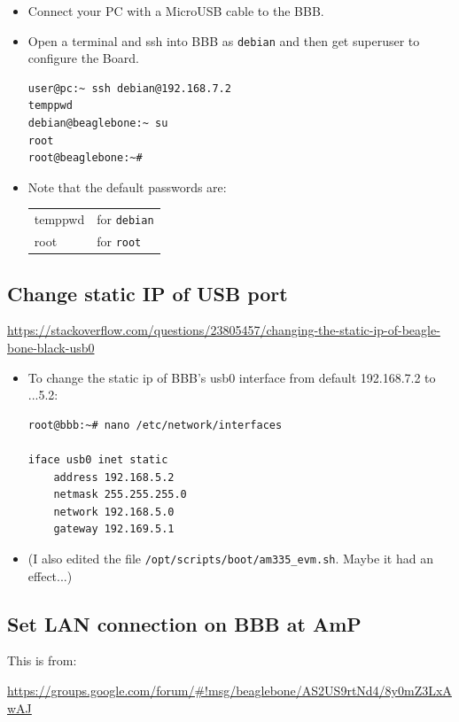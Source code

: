 \documentclass[
	fontsize=10pt
	paper=a4
]{scrartcl}
\begin{document}
\begin{itemize}
\item Connect your PC with a MicroUSB cable to the BBB.

\item Open a terminal and ssh into BBB as \texttt{debian} and then get superuser to configure the Board.
\begin{lstlisting}
user@pc:~ ssh debian@192.168.7.2
temppwd
debian@beaglebone:~ su
root
root@beaglebone:~#
\end{lstlisting}

\item Note that the default passwords are:
\begin{tabular}{l|l}
temppwd & for \texttt{debian} \\
root & for \texttt{root}
\end{tabular}

\end{itemize}



\subsection{Change static IP of USB port}
\url{https://stackoverflow.com/questions/23805457/changing-the-static-ip-of-beagle-bone-black-usb0}

\begin{itemize}
\item To change the static ip of BBB's usb0 interface from default 192.168.7.2 to ...5.2:

\begin{lstlisting}
root@bbb:~# nano /etc/network/interfaces

iface usb0 inet static
	address 192.168.5.2
	netmask 255.255.255.0
	network 192.168.5.0
	gateway 192.169.5.1
\end{lstlisting}


\item (I also edited the file \texttt{/opt/scripts/boot/am335\_evm.sh}. Maybe it had an effect...)

\end{itemize}


\subsection{Set LAN connection on BBB at AmP}

This is from:

\url{https://groups.google.com/forum/#!msg/beaglebone/AS2US9rtNd4/8y0mZ3LxAwAJ}
\end{document}
